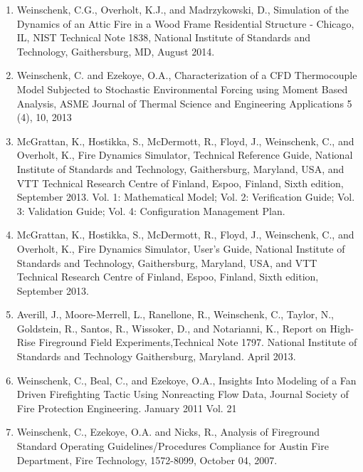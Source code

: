 \documentclass[10pt,letterpaper]{article}
\begin{document}
\begin{enumerate}
\item Weinschenk, C.G., Overholt, K.J., and Madrzykowski, D., Simulation of the Dynamics of an Attic Fire in a Wood Frame Residential Structure - Chicago, IL, NIST Technical Note 1838, National Institute of Standards and Technology, Gaithersburg, MD, August 2014.
\item  Weinschenk, C. and Ezekoye, O.A., Characterization of a CFD Thermocouple Model Subjected to Stochastic Environmental Forcing using Moment Based Analysis, ASME Journal of Thermal Science and Engineering Applications 5 (4), 10, 2013
\item McGrattan, K., Hostikka, S., McDermott, R., Floyd, J., Weinschenk, C., and Overholt, K., Fire Dynamics Simulator, Technical Reference Guide, National Institute of Standards and Technology, Gaithersburg, Maryland, USA, and VTT Technical Research Centre of Finland, Espoo, Finland, Sixth edition, September 2013. Vol. 1: Mathematical Model; Vol. 2: Verification Guide; Vol. 3: Validation Guide; Vol. 4: Configuration Management Plan.
\item McGrattan, K., Hostikka, S., McDermott, R., Floyd, J., Weinschenk, C., and Overholt, K., Fire Dynamics Simulator, User's Guide, National Institute of Standards and Technology, Gaithersburg, Maryland, USA, and VTT Technical Research Centre of Finland, Espoo, Finland, Sixth edition, September 2013.
\item Averill, J., Moore-Merrell, L., Ranellone, R., Weinschenk, C., Taylor, N., Goldstein, R., Santos, R., Wissoker, D., and Notarianni, K., Report on High-Rise Fireground Field Experiments,Technical Note 1797. National Institute of Standards and Technology Gaithersburg, Maryland. April 2013.
\item Weinschenk, C., Beal, C., and Ezekoye, O.A., Insights Into Modeling of a Fan Driven Firefighting Tactic Using Nonreacting Flow Data, Journal Society of Fire Protection Engineering. January 2011 Vol. 21
\item Weinschenk, C., Ezekoye, O.A. and Nicks, R., Analysis of Fireground Standard Operating Guidelines/Procedures Compliance for Austin Fire Department, Fire Technology, 1572-8099, October 04, 2007.
\end{enumerate}

\end{document}
